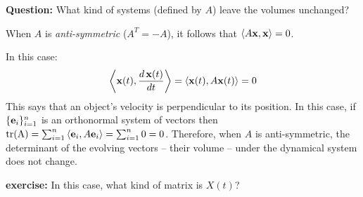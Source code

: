 \documentclass{article}
\begin{document}
{\bf Question:\/} What kind of systems (defined by $A$) leave the volumes unchanged?

When $A$ is {\em anti-symmetric\/} ($A^T = -A$), it follows that  $\left< A {\bf x}, {\bf x} \right> = 0$.

In this case:
\begin{eqnarray}
  \left< {\bf x}(t), \frac{d \, {\bf x}(t)}{dt} \right>
  = \left< {\bf x}(t), A {\bf x}(t)\right> = 0
\end{eqnarray}
This says that an object's
velocity is perpendicular to its position. In this case, if $\{{\bf e}_i\}_{i=1}^n$ is
an orthonormal system of vectors then
${\rm tr(A)} = \sum_{i=1}^n \left< {\bf e}_i, A {\bf e}_i \right> = \sum_{i=1}^n 0 = 0$.
Therefore, when $A$ is anti-symmetric, the determinant of the evolving
vectors -- their volume -- under the dynamical system does not change.

{\bf exercise:\/} In this case, what kind of matrix is $X(t)$?
\end{document}
